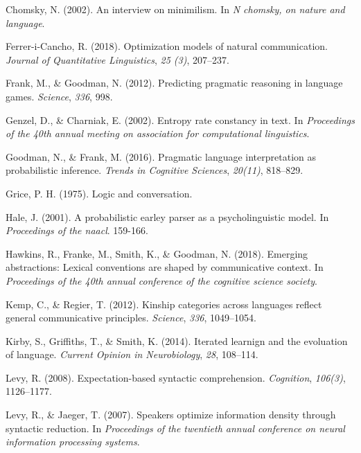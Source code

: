 \documentclass[10pt, letterpaper]{article}
\begin{document}
\hypertarget{ref-Chomsky2002a}{}
Chomsky, N. (2002). An interview on minimilism. In \emph{N chomsky, on
nature and language}.

\hypertarget{ref-FerreriCancho2018a}{}
Ferrer-i-Cancho, R. (2018). Optimization models of natural
communication. \emph{Journal of Quantitative Linguistics}, \emph{25
(3)}, 207--237.

\hypertarget{ref-FrankGoodman2012a}{}
Frank, M., \& Goodman, N. (2012). Predicting pragmatic reasoning in
language games. \emph{Science}, \emph{336}, 998.

\hypertarget{ref-GenzelCharniak2002a}{}
Genzel, D., \& Charniak, E. (2002). Entropy rate constancy in text. In
\emph{Proceedings of the 40th annual meeting on association for
computational linguistics}.

\hypertarget{ref-GoodmanFrank2016a}{}
Goodman, N., \& Frank, M. (2016). Pragmatic language interpretation as
probabilistic inference. \emph{Trends in Cognitive Sciences},
\emph{20(11)}, 818--829.

\hypertarget{ref-Grice1975a}{}
Grice, P. H. (1975). Logic and conversation.

\hypertarget{ref-Hale2001a}{}
Hale, J. (2001). A probabilistic earley parser as a psycholinguistic
model. In \emph{Proceedings of the naacl}. 159-166.

\hypertarget{ref-HawkinsFrankeSmithGoodman2018a}{}
Hawkins, R., Franke, M., Smith, K., \& Goodman, N. (2018). Emerging
abstractions: Lexical conventions are shaped by communicative context.
In \emph{Proceedings of the 40th annual conference of the cognitive
science society}.

\hypertarget{ref-KempRegier2012a}{}
Kemp, C., \& Regier, T. (2012). Kinship categories across languages
reflect general communicative principles. \emph{Science}, \emph{336},
1049--1054.

\hypertarget{ref-KirbyGriffithsSmith2014a}{}
Kirby, S., Griffiths, T., \& Smith, K. (2014). Iterated learnign and the
evoluation of language. \emph{Current Opinion in Neurobiology},
\emph{28}, 108--114.

\hypertarget{ref-Levy2008a}{}
Levy, R. (2008). Expectation-based syntactic comprehension.
\emph{Cognition}, \emph{106(3)}, 1126--1177.

\hypertarget{ref-LevyJaeger2007a}{}
Levy, R., \& Jaeger, T. (2007). Speakers optimize information density
through syntactic reduction. In \emph{Proceedings of the twentieth
annual conference on neural information processing systems}.
\end{document}
